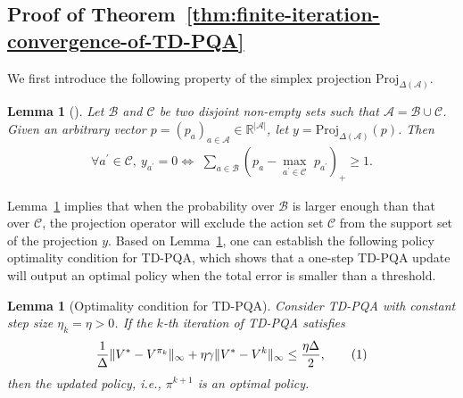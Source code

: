 \documentclass[10pt]{article}
\newcommand{\Proj}{\text{Proj}}
\newcommand{\calA}{\mathcal{A}}
\newcommand{\calS}{\mathcal{S}}
\newcommand\numberthis{\addtocounter{equation}{1}\tag{\theequation}}
\theoremstyle{plain}
\newtheorem{lemma}[theorem]{Lemma}
\theoremstyle{definition}
\begin{document}
\subsection{Proof of Theorem~\ref{thm:finite-iteration-convergence-of-TD-PQA}}
\label{sec:pf:thm:finite-iteration-convergence-of-TD-PQA}
We first introduce the following property of the simplex projection $\Proj_{\Delta(\calA)}$. 
\begin{lemma}[]
    Let $\mathcal{B}$ and $\mathcal{C}$ be two disjoint non-empty sets such that $\mathcal{A} =\mathcal{B}\cup \mathcal{C}$. Given an arbitrary vector $p=\left( p_a \right) _{a\in \mathcal{A}}\in \mathbb{R} ^{\left| \mathcal{A} \right|}$, let $y=\mathrm{Proj}_{\Delta \left( \mathcal{A} \right)}\left( p \right)$. Then
    \begin{align*}
        \forall a^\prime\in \mathcal{C},~ y_{a^\prime}=0 \Leftrightarrow \,\,\sum_{a\in \mathcal{B}}{\left( p_a-\underset{a^{\prime}\in \mathcal{C}}{\max}\,\,p_{a^{\prime}} \right) _+}\ge 1.
    \end{align*}
    \label{lem:gap-property-of-projection}
\end{lemma}
Lemma~\ref{lem:gap-property-of-projection} implies that when the probability over $\mathcal{B}$ is larger enough than that over $\mathcal{C}$, the projection operator will exclude the action set $\mathcal{C}$ from the support set of the projection $y$. Based on Lemma~\ref{lem:gap-property-of-projection}, one can establish the following policy optimality condition for TD-PQA,
which shows that a one-step TD-PQA update will output an optimal policy when the total error is smaller than a threshold. 
\begin{lemma}[Optimality condition for TD-PQA]
    Consider TD-PQA with constant step size $\eta_k = \eta > 0$. If the $k$-th iteration of TD-PQA satisfies
    \begin{align*}
        \frac{1}{\Delta}\| V^* - V^{\pi_k} \|_\infty + \eta\gamma \| V^* - V^{k} \|_\infty \leq \frac{\eta\Delta}{2},
        \numberthis \label{eq:optimality-condition-for-TD-PQA}
    \end{align*}
    then the updated policy, i.e., $\pi^{k+1}$ is an optimal policy. 
    \label{lem:optimality-condition-for-TD-PQA}
\end{lemma}
\end{document}
